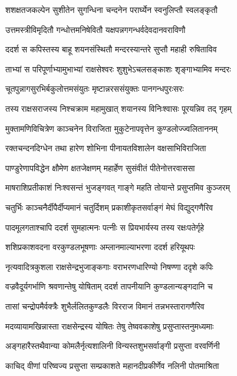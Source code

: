 \twolineshloka
{शशक्षतजकल्पेन सुशीतेन सुगन्धिना}
{चन्दनेन परार्घ्येन स्वनुलिप्तौ स्वलङ्कृतौ} %

\twolineshloka
{उत्तमस्त्रीविमृदितौ गन्धोत्तमनिषेवितौ}
{यक्षपन्नगगन्धर्वदेवदानवराविणौ} %

\twolineshloka
{ददर्श स कपिस्तस्य बाहू शयनसंस्थितौ}
{मन्दरस्यान्तरे सुप्तौ महाही रुषिताविव} %

\twolineshloka
{ताभ्यां स परिपूर्णाभ्यामुभाभ्यां राक्षसेश्वरः}
{शुशुभेऽचलसङ्काशः शृङ्गाभ्यामिव मन्दरः} %

\twolineshloka
{चूतपुन्नागसुरभिर्बकुलोत्तमसंयुतः}
{मृष्टान्नरससंयुक्तः पानगन्धपुरःसरः} %

\twolineshloka
{तस्य राक्षसराजस्य निश्चक्राम महामुखात्}
{शयानस्य विनिःश्वासः पूरयन्निव तद् गृहम्} %

\twolineshloka
{मुक्तामणिविचित्रेण काञ्चनेन विराजिता}
{मुकुटेनापवृत्तेन कुण्डलोज्ज्वलिताननम्} %

\twolineshloka
{रक्तचन्दनदिग्धेन तथा हारेण शोभिना}
{पीनायतविशालेन वक्षसाभिविराजिता} %

\twolineshloka
{पाण्डुरेणापविद्धेन क्षौमेण क्षतजेक्षणम्}
{महार्हेण सुसंवीतं पीतेनोत्तरवाससा} %

\twolineshloka
{माषराशिप्रतीकाशं निःश्वसन्तं भुजङ्गवत्}
{गाङ्गे महति तोयान्ते प्रसुप्तमिव कुञ्जरम्} %

\twolineshloka
{चतुर्भिः काञ्चनैर्दीपैर्दीप्यमानं चतुर्दिशम्}
{प्रकाशीकृतसर्वाङ्गं मेघं विद्युद्गणैरिव} %

\twolineshloka
{पादमूलगताश्चापि ददर्श सुमहात्मनः}
{पत्नीः स प्रियभार्यस्य तस्य रक्षःपतेर्गृहे} %

\twolineshloka
{शशिप्रकाशवदना वरकुण्डलभूषणाः}
{अम्लानमाल्याभरणा ददर्श हरियूथपः} %

\twolineshloka
{नृत्यवादित्रकुशला राक्षसेन्द्रभुजाङ्कगाः}
{वराभरणधारिण्यो निषण्णा ददृशे कपिः} %

\twolineshloka
{वज्रवैदूर्यगर्भाणि श्रवणान्तेषु योषिताम्}
{ददर्श तापनीयानि कुण्डलान्यङ्गदानि च} %

\twolineshloka
{तासां चन्द्रोपमैर्वक्त्रैः शुभैर्ललितकुण्डलैः}
{विरराज विमानं तन्नभस्तारागणैरिव} %

\twolineshloka
{मदव्यायामखिन्नास्ता राक्षसेन्द्रस्य योषितः}
{तेषु तेष्ववकाशेषु प्रसुप्तास्तनुमध्यमाः} %

\twolineshloka
{अङ्गहारैस्तथैवान्या कोमलैर्नृत्यशालिनी}
{विन्यस्तशुभसर्वाङ्गी प्रसुप्ता वरवर्णिनी} %

\twolineshloka
{काचिद् वीणां परिष्वज्य प्रसुप्ता सम्प्रकाशते}
{महानदीप्रकीर्णेव नलिनी पोतमाश्रिता} %

